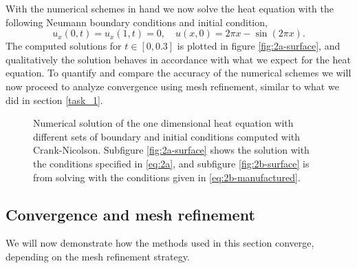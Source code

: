 With the numerical schemes in hand we now solve the heat equation with the following Neumann boundary conditions and initial condition, 
\begin{equation}
    u_x(0,t) = u_x(1,t) = 0, \quad u(x,0) = 2\pi x - \sin(2\pi x). 
    \label{eq:2a}
\end{equation}
The computed solutions for $t \in [0, 0.3]$ is plotted in figure \ref{fig:2a-surface}, 
and qualitatively the solution behaves in accordance with what we expect for the heat equation. 
To quantify and compare the accuracy of the numerical schemes we will now proceed to analyze convergence using mesh refinement, 
similar to what we did in section \ref{task_1}. 

%    

\begin{figure}[hb]
    \caption{
        Numerical solution of the one dimensional heat equation with different sets of boundary and initial conditions computed with Crank-Nicolson. 
        Subfigure \ref{fig:2a-surface} shows the solution with the conditions specified in \eqref{eq:2a}, 
        and subfigure \ref{fig:2b-surface} is from solving with the conditions given in \eqref{eq:2b-manufactured}. 
    }
\end{figure}


%    

\subsection{Convergence and mesh refinement}
We will now demonstrate how the methods used in this section converge, depending on the mesh refinement strategy. 

